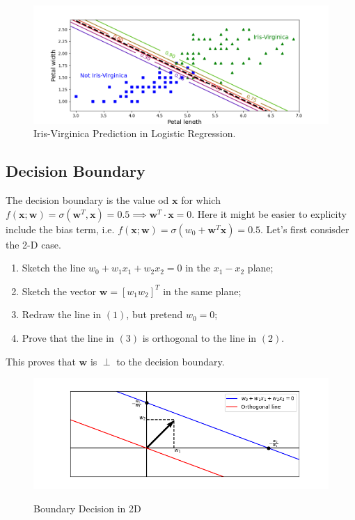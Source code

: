 \documentclass[a4paper, 11pt]{article}
\begin{document}
\begin{figure}[H]
        \centering
        \includegraphics[scale=0.7]{iris.png}
        \caption{Iris-Virginica Prediction in Logistic Regression.}
        \label{fig:Iris}
\end{figure}

\subsection{Decision Boundary}
The decision boundary is the value od $\mathbf{x}$ for which $f(\mathbf{x}; \mathbf{w}) = \sigma(\mathbf{w}^{T}, \mathbf{x}) = 0.5\implies \mathbf{w}^{T}\cdot\mathbf{x} = 0$.
Here it might be easier to explicity include the bias term, i.e. $f(\mathbf{x}; \mathbf{w}) = \sigma(w_0 + \mathbf{w}^{T}\mathbf{x}) = 0.5$. Let's first consisder the 2-D case.
\begin{enumerate}
        \item Sketch the line $w_0 + w_1x_1 + w_2x_2 = 0$ in the $x_1-x_2$ plane;
        \item Sketch the vector $\mathbf{w} = [w_1 w_2]^{T}$ in the same plane;
        \item Redraw the line in $(1)$, but pretend $w_0 = 0$;
        \item Prove that the line in $(3)$ is orthogonal to the line in $(2)$.
\end{enumerate}
This proves that $\mathbf{w}$ is $\perp$ to the decision boundary.

\begin{figure}[H]
        \centering
        \includegraphics[scale=0.8]{decisionboundary.png}
        \label{fig:DecisionBD}
        \caption{Boundary Decision in 2D}
\end{figure}
\end{document}
